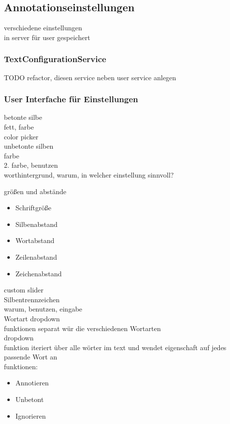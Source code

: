\subsection{Annotationseinstellungen}

verschiedene einstellungen\\
in server für user gespeichert\\

\subsubsection{TextConfigurationService}

TODO refactor, diesen service neben user service anlegen

\subsubsection{User Interfache für Einstellungen}
betonte silbe\\
fett, farbe\\

color picker\\

unbetonte silben\\
farbe\\
2. farbe, benutzen\\

worthintergrund, warum, in welcher einstellung sinnvoll?

größen und abstände\\
\begin{itemize}
	\item Schriftgröße
	\item Silbenabstand
	\item Wortabstand
	\item Zeilenabstand
	\item Zeichenabstand
\end{itemize}

custom slider\\

Silbentrennzeichen\\
warum, benutzen, eingabe\\

Wortart dropdown\\
funktionen separat wür die verschiedenen Wortarten\\
dropdown\\
funktion iteriert über alle wörter im text und wendet eigenschaft auf jedes passende Wort an\\
funktionen:\\
\begin{itemize}
	\item Annotieren
	\item Unbetont
	\item Ignorieren
\end{itemize}

